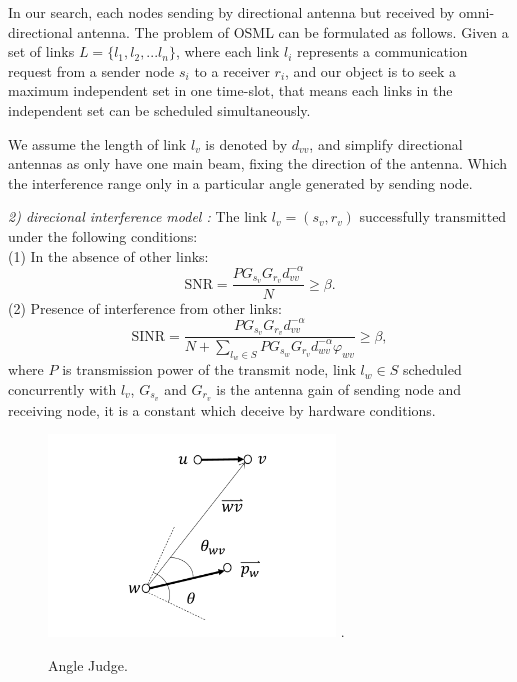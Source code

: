 \documentclass[conference]{IEEEtran}
\begin{document}
In our search, each nodes sending by directional antenna but received by omni-directional antenna. The problem of OSML can be formulated as follows. Given a set of links $L=\{l_1,l_2,...l_n\}$, where each link $l_i$ represents a communication request from a sender node $s_i$ to a receiver $r_i$, and our object is to seek a maximum independent set in one time-slot, that means each links in the independent set can be scheduled simultaneously.

We assume the length of link $l_v$ is denoted by $d_{vv}$, and simplify directional antennas as only have one main beam, fixing the direction of the antenna. Which the interference range only in a particular angle generated by sending node.


\emph{2) direcional interference model \cite{11}:} The link $l_v=(s_v,r_v)$ successfully transmitted under the following conditions:\\
(1) In the absence of other links:
\begin{equation}
\textrm{SNR}=\frac{PG_{s_v} G_{r_v} d^{-\alpha}_{vv}}{N} \geq \beta.
\end{equation}
(2) Presence of interference from other links:
\begin{equation}
  \textrm{SINR}=\frac{PG_{s_v} G_{r_v} d^{-\alpha}_{vv}}{N+ \sum _{l_w \in S}P G_{s_w} G_{r_v} d^{- \alpha}_{wv} \varphi _{wv}} \geq \beta,
\end{equation}
where $P$ is transmission power of the transmit node, link $l_w \in S$ scheduled concurrently with $l_v$, $G_{s_v}$ and $G_{r_v}$ is the antenna gain of sending node and receiving node, it is a constant which deceive by hardware conditions.

\begin{figure}[!t]
\centering
\includegraphics[width=3in]{image/direction.pdf}
\DeclareGraphicsExtensions.
\caption{Angle Judge.}
\label{Angle Judge}
\end{figure}
\end{document}
